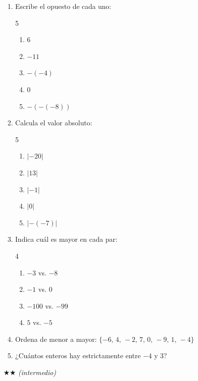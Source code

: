 \documentclass[11pt, letterpaper]{article}
\begin{document}
\begin{enumerate}[label=\textbf{\arabic*.}, leftmargin=*]
  \item Escribe el opuesto de cada uno:
  \begin{multicols}{5}
  \begin{enumerate}[label=\alph*)]
    \item $6$
    \item $-11$
    \item $-(-4)$
    \item $0$
    \item $-(-(-8))$
  \end{enumerate}
  \end{multicols}

  \item Calcula el valor absoluto:
  \begin{multicols}{5}
  \begin{enumerate}[label=\alph*)]
    \item $|-20|$
    \item $|13|$
    \item $|-1|$
    \item $|0|$
    \item $|-(-7)|$
  \end{enumerate}
  \end{multicols}

  \item Indica cu\'al es mayor en cada par:
  \begin{multicols}{4}
  \begin{enumerate}[label=\alph*)]
    \item $-3$ vs. $-8$
    \item $-1$ vs. $0$
    \item $-100$ vs. $-99$
    \item $5$ vs. $-5$
  \end{enumerate}
  \end{multicols}

  \item Ordena de menor a mayor: $\{-6,\,4,\,-2,\,7,\,0,\,-9,\,1,\,-4\}$

  \item ¿Cu\'antos enteros hay estrictamente entre $-4$ y $3$?
\end{enumerate}

$\bigstar\bigstar$ \textit{(intermedio)}
\end{document}
